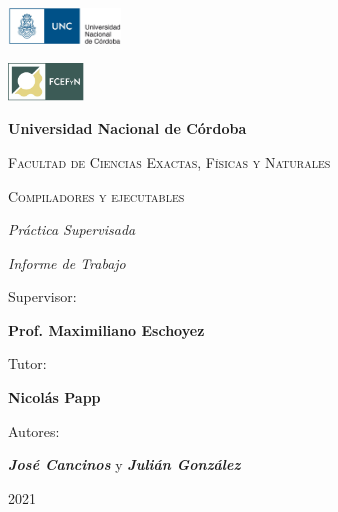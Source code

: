 \begin{titlepage}
    \centering
    {\includegraphics[width=0.225\textwidth]{../img/logo.jpg}}
    \hspace{1cm}
    {\includegraphics[width=0.15\textwidth]{../img/fcefyn.png}\par}
    \vspace{1cm}
    {\bfseries\LARGE Universidad Nacional de Córdoba \par}
    \vspace{0.7cm}
    {\scshape\Large Facultad de Ciencias Exactas, Físicas y Naturales\par}
    \vspace{2cm}
    {\scshape\Huge Compiladores y ejecutables \par}
    \vspace{2cm}
    {\itshape\Large Práctica Supervisada \par}
    \vspace{1.5cm}
    {\itshape\large Informe de Trabajo \par}
    \vfill
    \vspace{0.5cm}
    {\Large Supervisor: \par}
    \vspace{0.3cm}
    {\Large \textbf{Prof. Maximiliano Eschoyez}\par}
    \vspace{0.5cm}
    {\Large Tutor: \par}
    \vspace{0.3cm}
    {\Large \textbf{Nicolás Papp}\par}
    \vspace{0.5cm}
    {\Large Autores: \par}
    \vspace{0.3cm}
    {\Large \textbf{\emph{José Cancinos}} y \textbf{\emph{Julián González}}\par}
    \vfill
    \vspace{0.5cm} 
    {\small 2021 \par}
\end{titlepage}

